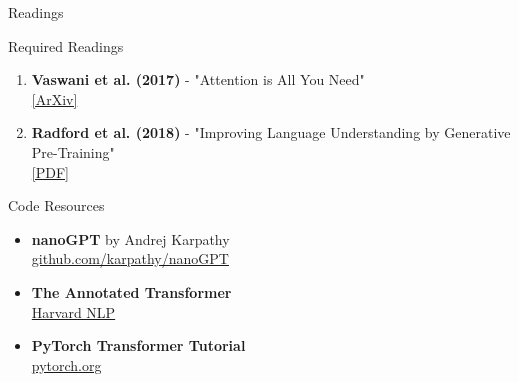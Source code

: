 \documentclass[aspectratio=169]{beamer}
\begin{document}
\begin{frame}[shrink=10]{Readings 📖}
\small
    \begin{block}{Required Readings}
        \begin{enumerate}\setlength{\itemsep}{0pt}
            \item \textbf{Vaswani et al. (2017)} - "Attention is All You Need" \\
            \href{https://arxiv.org/abs/1706.03762}{[ArXiv]}

            \item \textbf{Radford et al. (2018)} - "Improving Language Understanding by Generative Pre-Training" \\
            \href{https://cdn.openai.com/research-covers/language-unsupervised/language_understanding_paper.pdf}{[PDF]}
        \end{enumerate}
    \end{block}

    \vspace{0.3cm}

    \begin{block}{Code Resources}
        \begin{itemize}\setlength{\itemsep}{0pt}
            \item \textbf{nanoGPT} by Andrej Karpathy \\
            \href{https://github.com/karpathy/nanoGPT}{github.com/karpathy/nanoGPT}

            \item \textbf{The Annotated Transformer} \\
            \href{https://nlp.seas.harvard.edu/2018/04/03/attention.html}{Harvard NLP}

            \item \textbf{PyTorch Transformer Tutorial} \\
            \href{https://pytorch.org/tutorials/beginner/transformer_tutorial.html}{pytorch.org}
        \end{itemize}
    \end{block}
\end{frame}
\end{document}
